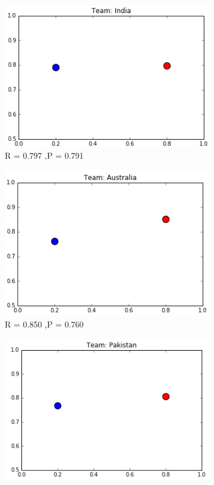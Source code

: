 \documentclass[a4paper, 10pt, conference]{IEEEtran}
\begin{document}
\begin{figure}[h!]
  \centering
  \begin{subfigure}[b]{0.4\linewidth}
    \includegraphics[width=\linewidth]{MLPCLF_India.png}
    \caption{R = 0.797 ,P = 0.791}
  \end{subfigure}
  \begin{subfigure}[b]{0.4\linewidth}
    \includegraphics[width=\linewidth]{MLPCLF_Australia.png}
    \caption{R = 0.850 ,P = 0.760}
  \end{subfigure}
  \begin{subfigure}[b]{0.4\linewidth}
    \includegraphics[width=\linewidth]{MLPCLF_Pakistan.png}

\end{subfigure}
\end{figure}
\end{document}
